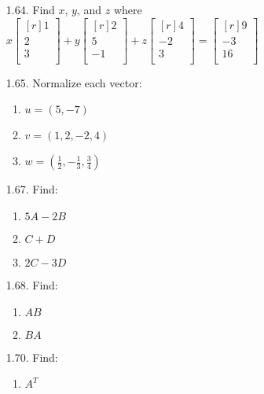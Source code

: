 \documentclass[12pt]{article}
\begin{document}
\begin{enumerate}
\item[1.64.] Find $x$, $y$, and $z$ where
	$x \begin{bmatrix}[r] 1\\ 2\\ 3\\ \end{bmatrix}
	+ y \begin{bmatrix}[r] 2\\ 5\\ -1\\ \end{bmatrix}
	+ z \begin{bmatrix}[r] 4\\ -2\\ 3\\ \end{bmatrix}
	= \begin{bmatrix}[r] 9\\ -3\\ 16\\ \end{bmatrix}$
\item[1.65.] Normalize each vector:
	\begin{enumerate}
	\item $u=(5,-7)$
	\item $v=(1,2,-2,4)$
	\item $w=(\frac{1}{2},-\frac{1}{3},\frac{3}{4})$
	\end{enumerate}
\item[1.67.] Find:
	\begin{enumerate}
	\item $5A-2B$
	\item $C+D$
	\item $2C-3D$
	\end{enumerate}
\item[1.68.] Find:
	\begin{enumerate}
	\item $AB$
	\item $BA$
	\end{enumerate}
\item[1.70.] Find:
	\begin{enumerate}
	\item $A^T$
	

\end{enumerate}
\end{enumerate}
\end{document}
